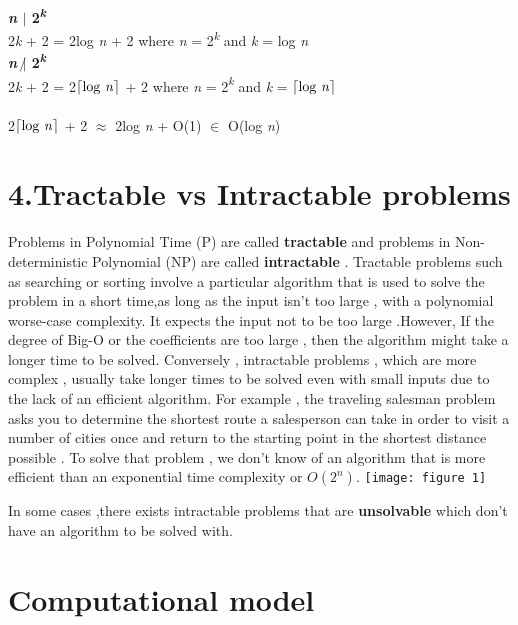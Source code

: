\documentclass[11pt]{article}
\DeclarePairedDelimiter\ceil{\lceil}{\rceil}
\theoremstyle{plain}
\theoremstyle{definition}
\begin{document}
\setlength{\parindent}{0pt}\textbf{\textit{n} $|$ 2\textit{\textsuperscript{k}}}\\
2\textit{k} + 2 = 2log \textit{n} + 2 where \textit{n} = 2\textit{\textsuperscript{k}} and \textit{k} = log \textit{n}\\

\textbf{\textit{n} $\not|$ 2\textit{\textsuperscript{k}}}\\
2\textit{k} + 2 = 2$\ceil*{\textnormal{log \textit{n}}}$ + 2 where \textit{n} = 2\textit{\textsuperscript{k}} and \textit{k} = $\ceil*{\textnormal{log \textit{n}}}$\\\\
2$\ceil*{\textnormal{log \textit{n}}}$ + 2 $\approx$ 2log \textit{n} + O(1) $\in$ O(log \textit{n})



\section*{4.Tractable vs Intractable problems }
Problems in Polynomial Time (P) are called \textbf{tractable} and problems in Non-deterministic Polynomial (NP) are called \textbf{intractable} \cite{rosen:1}.
Tractable problems such as searching or sorting involve a particular algorithm that is used to solve the problem in a short time,as long as the input isn't too large , with a polynomial worse-case complexity. It expects the input not to be too large
.However, If the degree of Big-O or the coefficients are too
large , then the algorithm might take a longer time to be solved.
Conversely , intractable problems , which are more complex , usually take longer times to be solved even with small inputs due to the lack of an efficient algorithm. 
For example , the traveling salesman problem asks you to determine the shortest route a salesperson 
can take in order to visit a number of cities once and return to the starting point in the shortest distance possible .
To solve that problem , we don't know of an algorithm that is more efficient than an exponential time complexity or $O(2^n)$.
\bigbreak
\texttt{[image: figure 1]}

\bigbreak
In some cases ,there exists intractable problems that are \textbf{unsolvable}  which don't have an algorithm to be solved with. 

\section*{Computational model}
\end{document}
